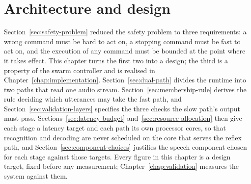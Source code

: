 %
%

\chapter{Architecture and design}
\label{chap:architecture}

Section~\ref{sec:safety-problem} reduced the safety problem to three requirements: a wrong
command must be hard to act on, a stopping command must be fast to act on, and the execution of
any command must be bounded at the point where it takes effect. This chapter turns the first two
into a design; the third is a property of the swarm controller and is realised in
Chapter~\ref{chap:implementation}. Section~\ref{sec:dual-path} divides the runtime into two paths
that read one audio stream. Section~\ref{sec:membership-rule} derives the rule deciding which
utterances may take the fast path, and Section~\ref{sec:validation-layers} specifies the three
checks the slow path's output must pass. Sections~\ref{sec:latency-budget}
and~\ref{sec:resource-allocation} then give each stage a latency target and each path its own
processor cores, so that recognition and decoding are never scheduled on the core that serves the
reflex path, and Section~\ref{sec:component-choices} justifies the speech component chosen for each
stage against those targets. Every figure in this chapter is a design target, fixed before any measurement;
Chapter~\ref{chap:validation} measures the system against them.


